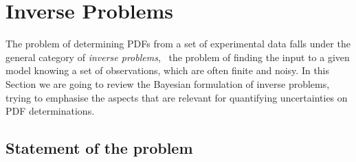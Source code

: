 
\section{Inverse Problems}
\label{sec:inverse-problems}

The problem of determining PDFs from a set of experimental data falls under the
general category of {\em inverse problems}, \ie\ the problem of finding the
input to a given model knowing a set of observations, which are often finite and
noisy. In this Section we are going to review the Bayesian formulation of
inverse problems, trying to emphasise the aspects that are relevant for
quantifying uncertainties on PDF determinations. 

\subsection{Statement of the problem}
\label{sec:BayesianInverse}

